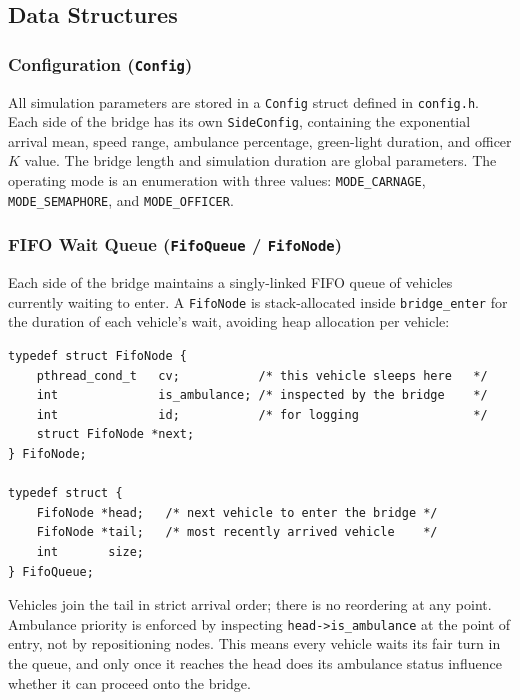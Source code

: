 \documentclass[12pt]{article}
\begin{document}
\subsection{Data Structures}

\subsubsection{Configuration (\texttt{Config})}

All simulation parameters are stored in a \texttt{Config} struct defined
in \texttt{config.h}. Each side of the bridge has its own
\texttt{SideConfig}, containing the exponential arrival mean, speed range,
ambulance percentage, green-light duration, and officer $K$ value. The
bridge length and simulation duration are global parameters. The operating
mode is an enumeration with three values: \texttt{MODE\_CARNAGE},
\texttt{MODE\_SEMAPHORE}, and \texttt{MODE\_OFFICER}.

\subsubsection{FIFO Wait Queue (\texttt{FifoQueue} / \texttt{FifoNode})}

Each side of the bridge maintains a singly-linked FIFO queue of vehicles
currently waiting to enter. A \texttt{FifoNode} is stack-allocated inside
\texttt{bridge\_enter} for the duration of each vehicle's wait, avoiding
heap allocation per vehicle:

\begin{lstlisting}[style=cstyle, caption={FIFO node and queue structures (\texttt{bridge.h}).}]
typedef struct FifoNode {
    pthread_cond_t   cv;           /* this vehicle sleeps here   */
    int              is_ambulance; /* inspected by the bridge    */
    int              id;           /* for logging                */
    struct FifoNode *next;
} FifoNode;

typedef struct {
    FifoNode *head;   /* next vehicle to enter the bridge */
    FifoNode *tail;   /* most recently arrived vehicle    */
    int       size;
} FifoQueue;
\end{lstlisting}

Vehicles join the tail in strict arrival order; there is no reordering at
any point. Ambulance priority is enforced by inspecting
\texttt{head->is\_ambulance} at the point of entry, not by repositioning
nodes. This means every vehicle waits its fair turn in the queue, and only
once it reaches the head does its ambulance status influence whether it can
proceed onto the bridge.
\end{document}

